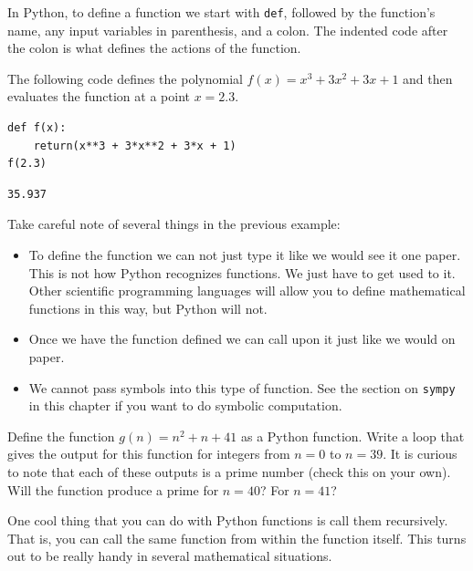 In Python, to define a function we start with \texttt{def}, followed by the function's
name, any input variables in parenthesis, and a colon.  The indented code after the colon
is what defines the actions of the function.

\begin{example}
The following code defines the polynomial $f(x) = x^3 + 3x^2 + 3x + 1$ and then evaluates
the function at a point $x=2.3$.

\bcode
\begin{lstlisting}
def f(x):
    return(x**3 + 3*x**2 + 3*x + 1)
f(2.3)
\end{lstlisting}
\boutput
\begin{lstlisting}
35.937
\end{lstlisting}
\end{example}
Take careful note of several things in the previous example:
\begin{itemize}
    \item To define the function we can not just type it like we would see it one paper.
        This is not how Python recognizes functions.  We just have to get used to it.
        Other scientific programming languages will allow you to define mathematical
        functions in this way, but Python will not.
    \item Once we have the function defined we can call upon it just like we would on
        paper.
    \item We cannot pass symbols into this type of function.  See the section on
        \texttt{sympy} in this chapter if you want to do symbolic computation.
\end{itemize}


\begin{problem}\label{prob_python:prime_gen}
    Define the function $g(n) = n^2 + n + 41$ as a Python function.  Write a loop that
    gives the output for this function for integers from $n=0$ to $n=39$.  It is curious
    to note that each of these outputs is a prime number (check this on your own).  Will
    the function produce a prime for $n=40$? For $n=41$?  
\end{problem}

One cool thing that you can do with Python functions is call them recursively.  That is,
you can call the same function from within the function itself.  This turns out to be
really handy in several mathematical situations.

